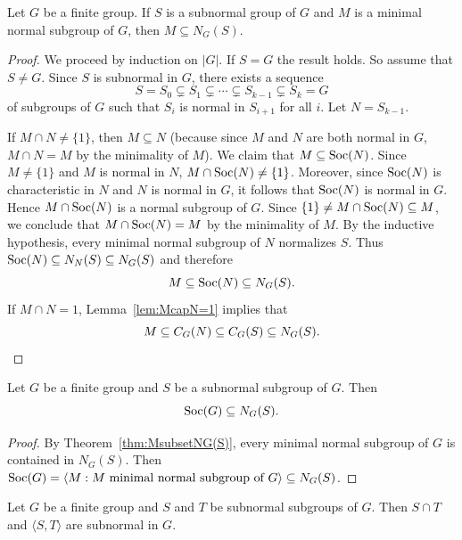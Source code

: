 \begin{theorem}[Wielandt]
	\label{thm:MsubsetNG(S)}
	Let $G$ be a finite group. If $S$ is a subnormal group of $G$ and 
	$M$ is a minimal normal subgroup of $G$, then $M\subseteq N_G(S)$.
\end{theorem}

\begin{proof}
	We proceed by induction on $|G|$. If $S=G$ the result holds. So assume that 
	$S\ne G$.  Since $S$ is subnormal in $G$, there exists a sequence 
	\[
		S=S_0\subsetneq S_1\subsetneq\cdots\subsetneq S_{k-1}\subsetneq S_k=G
	\]
    of subgroups of $G$ such that $S_i$ is normal in $S_{i+1}$ for all $i$. 
	Let $N=S_{k-1}$. 

	If $M\cap N\ne\{1\}$, then $M\subseteq N$ (because since $M$ and $N$ are both normal in $G$, 
	$M\cap N=M$ by the minimality of $M$). We claim that 
	$M\subseteq\operatorname{Soc}(N)$.  Since $M\ne\{1\}$ and $M$ is normal in $N$,
	$M\cap\operatorname{Soc}(N)\ne\{1\}$. Moreover, since $\operatorname{Soc}(N)$ is characteristic in $N$ and $N$ is 
	normal in $G$, it follows that $\operatorname{Soc}(N)$ is normal in $G$. Hence $M\cap\operatorname{Soc}(N)$ is a normal subgroup of $G$. 
	Since $\{1\}\ne M\cap\operatorname{Soc}(N)\subseteq M$, we conclude that 
	$M\cap\operatorname{Soc}(N)=M$ by the minimality of $M$. By the inductive hypothesis, 
	every minimal normal subgroup of $N$ normalizes $S$. Thus 
	$\operatorname{Soc}(N)\subseteq N_N(S)\subseteq N_G(S)$ and therefore 
	\[
	M\subseteq\operatorname{Soc}(N)\subseteq N_G(S).
	\]
	If $M\cap N=1$, Lemma~\ref{lem:McapN=1} implies that 
	\[
	M\subseteq C_G(N)\subseteq C_G(S)\subseteq N_G(S). \qedhere
	\]
\end{proof}

\begin{corollary}
    Let $G$ be a finite group and $S$ be a subnormal subgroup of $G$. Then 
    \[
    \operatorname{Soc}(G)\subseteq N_G(S).
    \]
\end{corollary}

\begin{proof}
	By Theorem~\ref{thm:MsubsetNG(S)}, every minimal normal subgroup of $G$ is contained in $N_G(S)$. Then 
	$\operatorname{Soc}(G)=\langle M:M\text{ minimal normal subgroup of $G$}\rangle\subseteq N_G(S)$.
\end{proof}

\begin{theorem}[Wielandt]
	\label{thm:STsubnormal}
	Let $G$ be a finite group and $S$ and $T$ be subnormal subgroups of $G$. Then $S\cap T$ and 
	$\langle S,T\rangle$ are subnormal in $G$.
\end{theorem}

